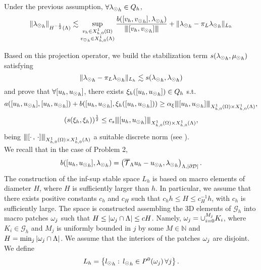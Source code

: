 \begin{lemma}\cite[Lemma2.1]{burman2014}
Under the previous assumption, $\forall {\lambda_{\odot}}_h \in Q_h$,
\begin{equation*}
\|{\lambda_{\odot}}_h\|_{H^{-\frac 12}(\Lambda)} \lesssim \sup_{\substack{v_h \in X_{h,0}^1(\Omega)\\ {v_{\odot}}_h \in X_{h,0}^1(\Lambda)}} \frac{b([v_h, {v_{\odot}}_h], {\lambda_{\odot}}_h)}{{\left\vert\kern-0.25ex\left\vert\kern-0.25ex\left\vert [v_h, {v_{\odot}}_h] \right\vert\kern-0.25ex\right\vert\kern-0.25ex\right\vert}} + \|{\lambda_{\odot}}_h - \pi_L {\lambda_{\odot}}_h\|_{L_h}
\end{equation*}
\end{lemma}
 Based on this projection operator, we build the stabilization term $s({\lambda_{\odot}}_h, {\mu_{\odot}}_h)$ satisfying
 \begin{equation*}
 \|{\lambda_{\odot}}_h- \pi_L {\lambda_{\odot}}_h\|_{L_h} \lesssim s({\lambda_{\odot}}_h, {\lambda_{\odot}}_h)
\end{equation*}  and prove that $\forall [u_h, {u_{\odot}}_h]$, there exists $\xi_h([u_h, {u_{\odot}}_h]) \in Q_h$ s.t.
\begin{equation}\label{stab_coercivity}
a([u_h, {\ud}_h],[u_h, {\ud}_h] ) + b([u_h, {\ud}_h], \xi_h([u_h, {\ud}_h])) \geq \alpha_\xi \vertiii{[u_h, {\ud}_h]}_{X_{h,0}^1(\Omega)\times X_{h,0}^1(\Lambda) },
\end{equation}
\begin{equation}\label{stab_stability}
(s(\xi_{h}, \xi_{h}))^{\frac 12} \leq c_s \vertiii{[u_h, {\ud}_h]}_{X_{h,0}^1(\Omega)\times X_{h,0}^1(\Lambda) },
\end{equation}
being ${\left\vert\kern-0.25ex\left\vert\kern-0.25ex\left\vert [\cdot \, ,\, \cdot]  \right\vert\kern-0.25ex\right\vert\kern-0.25ex\right\vert}_{X_{h,0}^1(\Omega)\times X_{h,0}^1(\Lambda) }$ a suitable discrete norm (see \cite[section II]{burman2014}). \\

We recall that in the case of Problem 2, 
\begin{equation*}
b([u_h, {u_{\odot}}_h], {\lambda_{\odot}}_h) = \left({\overline{\mathcal{T}}_\Lambda} u_h - {u_{\odot}}_h, {\lambda_{\odot}}_h\right)_{\Lambda,|\partial\mathcal{D}|}.
\end{equation*}
The construction of the inf-sup stable space $L_h$ is based on macro elements of diameter $H$, where $H$ is sufficiently larger than $h$. In particular, we assume that there exists positive constants $c_h$ and $c_H$ such that $c_h h\leq H \leq c_H^{-1}h$, with $c_h$ is sufficiently large. The space is constructed assembling the 3D elements of $\mathcal{G}_h$ into macro patches $ \omega _j $ such that {\color{red}$H \leq |\omega _j\cap \Lambda|\leq cH$}. Namely, $\omega _j=\cup _{i=0}^{M_j} K_i$, where $K_i \in \mathcal{G}_h$ and $M_j$ is uniformly bounded in $j$ by some $M\in \mathbb{N}$ and $H=\min_{j}|\omega _j\cap \Lambda|$. We assume that the interiors of the patches $\omega _j$ are  disjoint. We define 
\begin{equation*}
L_h=\left\{{l_{\odot} }_h: \, {l_{\odot} }_h\in P^0(\omega _j)\, \forall j \right\}.
\end{equation*}

